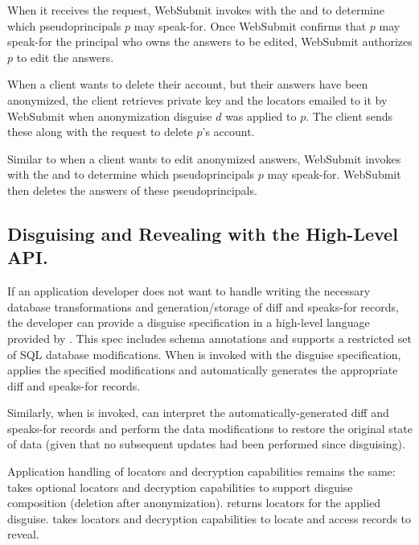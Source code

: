 When it receives the request, WebSubmit invokes  with the  and
 to determine which pseudoprincipals $p$ may speak-for.  Once WebSubmit confirms that $p$
may speak-for the principal who owns the answers to be edited, WebSubmit authorizes $p$ to edit the
answers.

 When a client wants to delete their account, but their
answers have been anonymized, the client retrieves private key  and the locators 
emailed to it by WebSubmit when anonymization disguise $d$ was applied to $p$. The client sends
these along with the request to delete $p$'s account.

Similar to when a client wants to edit anonymized answers, WebSubmit invokes 
with the  and  to determine which pseudoprincipals $p$ may speak-for.  WebSubmit
then deletes the answers of these pseudoprincipals.

\subsection{Disguising and Revealing with the High-Level API.}
\label{s:api-high} 
If an application developer does not want to handle writing the necessary
database transformations and generation/storage of diff and speaks-for records, the developer can
provide a disguise specification in a high-level language provided by \sys. This spec includes
schema annotations and supports a restricted set of SQL database modifications. When
 is invoked with the disguise specification, \sys applies the specified
modifications and automatically generates the appropriate diff and speaks-for records.

Similarly, when  is invoked, \sys can interpret the automatically-generated diff
and speaks-for records and perform the data modifications to restore the original state of data
(given that no subsequent updates had been performed since disguising).

Application handling of locators and decryption capabilities remains the same: 
takes optional locators and decryption capabilities to support disguise composition (\eg deletion
after anonymization).  returns locators for the applied disguise.
 takes locators and decryption capabilities to locate and access records to
reveal.
